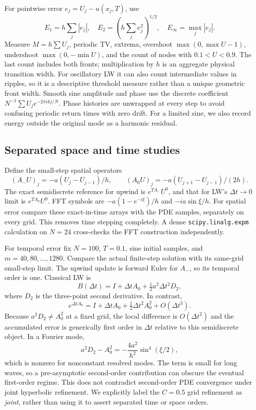For pointwise error $e_j=U_j-u(x_j,T)$, use
\begin{equation}
 E_1=h\sum_j|e_j|,\quad E_2=\left(h\sum_j e_j^2\right)^{1/2},\quad E_\infty=\max_j|e_j|.
\end{equation}
Measure $M=h\sum U_j$, periodic TV, extrema, overshoot $\max(0,\max U-1)$, undershoot $\max(0,-\min U)$, and the count of nodes with $0.1<U<0.9$. The last count includes both fronts; multiplication by $h$ is an aggregate physical transition width. For oscillatory LW it can also count intermediate values in ripples, so it is a descriptive threshold measure rather than a unique geometric front width. Smooth sine amplitude and phase use the discrete coefficient $N^{-1}\sum U_j e^{-2\pi i k j/N}$. Phase histories are unwrapped at every step to avoid confusing periodic return times with zero drift. For a limited sine, we also record energy outside the original mode as a harmonic residual.

\subsection{Separated space and time studies}
Define the small-step spatial operators
\begin{equation}
 (A_-U)_j=-a(U_j-U_{j-1})/h,\qquad
 (A_0U)_j=-a(U_{j+1}-U_{j-1})/(2h).
\end{equation}
The exact semidiscrete reference for upwind is $e^{TA_-}U^0$, and that for LW's $\Delta t\to0$ limit is $e^{TA_0}U^0$. FFT symbols are $-a(1-e^{-i\xi})/h$ and $-ia\sin\xi/h$. For spatial error compare these exact-in-time arrays with the PDE samples, separately on every grid. This removes time stepping completely. A dense \texttt{scipy.linalg.expm} calculation on $N=24$ cross-checks the FFT construction independently.

For temporal error fix $N=100$, $T=0.1$, sine initial samples, and $m=40,80,\ldots,1280$. Compare the actual finite-step solution with its same-grid small-step limit. The upwind update is forward Euler for $A_-$, so its temporal order is one. Classical LW is
\begin{equation}\label{eq:lwtime}
 B(\Delta t)=I+\Delta t A_0+\tfrac12a^2\Delta t^2D_2,
\end{equation}
where $D_2$ is the three-point second derivative. In contrast,
\begin{equation}
 e^{\Delta t A_0}=I+\Delta t A_0+\tfrac12\Delta t^2 A_0^2+O(\Delta t^3).
\end{equation}
Because $a^2D_2\ne A_0^2$ at a fixed grid, the local difference is $O(\Delta t^2)$ and the accumulated error is generically first order in $\Delta t$ relative to this semidiscrete object. In a Fourier mode,
\begin{equation}
 a^2D_2-A_0^2=-\frac{4a^2}{h^2}\sin^4(\xi/2),
\end{equation}
which is nonzero for nonconstant resolved modes. The term is small for long waves, so a pre-asymptotic second-order contribution can obscure the eventual first-order regime. This does not contradict second-order PDE convergence under joint hyperbolic refinement. We explicitly label the $C=0.5$ grid refinement as \emph{joint}, rather than using it to assert separated time or space orders.

